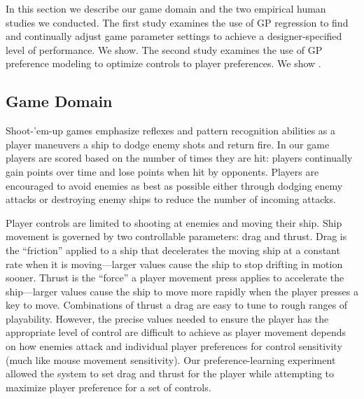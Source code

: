 \documentclass[letterpaper]{article}
\begin{document}
In this section we describe our game domain and the two empirical human studies we conducted. The first study examines the use of GP regression to find and continually adjust game parameter settings to achieve a designer-specified level of performance. We show. The second study examines the use of GP preference modeling to optimize controls to player preferences. We show .

\subsection{Game Domain}

 \label{fig:shmup}

Shoot-'em-up games emphasize reflexes and pattern recognition abilities as a player maneuvers a ship to dodge enemy shots and return fire. In our game players are scored based on the number of times they are hit: players continually gain points over time and lose points when hit by opponents. Players are encouraged to avoid enemies as best as possible either through dodging enemy attacks or destroying enemy ships to reduce the number of incoming attacks.

Player controls are limited to shooting at enemies and moving their ship. Ship movement is governed by two controllable parameters: drag and thrust. Drag is the ``friction'' applied to a ship that decelerates the moving ship at a constant rate when it is moving---larger values cause the ship to stop drifting in motion sooner. Thrust is the ``force'' a player movement press applies to accelerate the ship---larger values cause the ship to move more rapidly when the player presses a key to move. Combinations of thrust a drag are easy to tune to rough ranges of playability. However, the precise values needed to ensure the player has the appropriate level of control are difficult to achieve as player movement depends on how enemies attack and individual player preferences for control sensitivity (much like mouse movement sensitivity). Our preference-learning experiment allowed the system to set drag and thrust for the player while attempting to maximize player preference for a set of controls.
\end{document}
